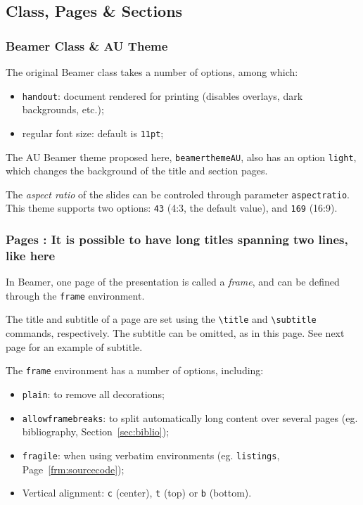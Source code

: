 \documentclass[10pt,    %
    english,            %
    xcolor=table,       %
    envcountsect,       %
    aspectratio=43      %
]{beamer}
\begin{document}
\subsection{Class, Pages \& Sections}
\begin{frame}
    \frametitle{Beamer Class \& AU Theme}
    
    The original Beamer class takes a number of options, among which:
    \begin{itemize}
        \item \texttt{handout}: document rendered for printing (disables overlays, dark backgrounds, etc.);
        \item regular font size: default is \texttt{11pt};
    \end{itemize}

    \vspace{0.25cm}
    The AU Beamer theme proposed here, \texttt{beamerthemeAU}, also has an option \texttt{light}, which changes the background of the title and section pages.
    
    \vspace{0.25cm}
    The \textit{aspect ratio} of the slides can be controled through parameter \texttt{aspectratio}. This theme supports two options: \texttt{43} (4:3, the default value), and \texttt{169} (16:9).
\end{frame}

\begin{frame}
    \frametitle{Pages : It is possible to have long titles spanning two lines, like here} 
    
    In Beamer, one page of the presentation is called a \textit{frame}, and can be defined through the \texttt{frame} environment.
    
    \vspace{0.25cm}
    The title and subtitle of a page are set using the \texttt{\textbackslash{}title} and \texttt{\textbackslash{}subtitle} commands, respectively. The subtitle can be omitted, as in this page. See next page for an example of subtitle.
    
    \vspace{0.25cm}
    The \texttt{frame} environment has a number of options, including: 
    \begin{itemize}
        \item \texttt{plain}: to remove all decorations;
        \item \texttt{allowframebreaks}: to split automatically long content over several pages (eg. bibliography, Section~\ref{sec:biblio});
        \item \texttt{fragile}: when using verbatim environments (eg. \texttt{listings}, Page~\ref{frm:sourcecode});
        \item Vertical alignment: \texttt{c} (center), \texttt{t} (top) or \texttt{b} (bottom).
    \end{itemize}
\end{frame}
\end{document}
